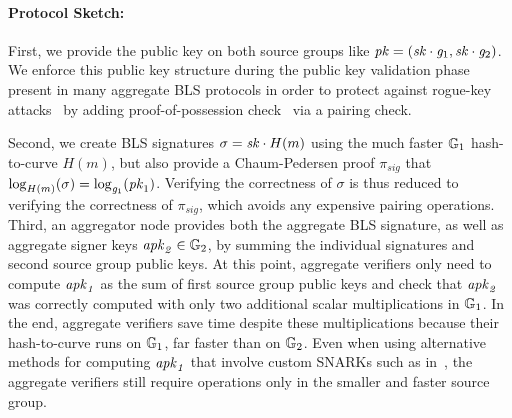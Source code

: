 \paragraph{Protocol Sketch:}
\begin{comment}
We adopt standard notation for pairing friendly curves throughout.


A classical BLS signature places the public key and signature on opposite
curves, but the choice of which creates trade offs. We mitigate these
trade offs:
\end{comment}

First, we provide the public key on both source groups%
like $\mathit{pk} = (\mathit{sk} \cdot \mathit{g}_{1}, \mathit{sk} \cdot \mathit{g}_{2})$.
We enforce this public key structure during the public key validation
phase present in many aggregate BLS protocols in order to protect against rogue-key attacks~\cite{proofs_of_posession}
by adding proof-of-possession check~\cite{proofs_of_posession} via a pairing check.

Second, we create BLS signatures $\sigma = \mathit{sk} \cdot H(m)$ using the much
faster $\mathbb{G}_{1}$ hash-to-curve $H(m)$, but also provide a Chaum-Pedersen proof
$\pi_{\mathit{sig}}$ that $\log_{H(m)}(\sigma)= \log_{\mathit{g}_{1}}(\mathit{pk}_1)$.
Verifying the correctness of $\sigma$ is thus reduced to verifying the correctness of $\pi_{\mathit{sig}}$, 
which avoids any expensive pairing operations. \\

Third, an aggregator node provides both the aggregate BLS signature,
as well as aggregate signer keys %
$\mathit{apk}_{\mathit{2}} \in \mathbb{G}_{2}$, by summing the individual signatures and second source group public keys.
At this point, aggregate verifiers only need to compute $\mathit{apk}_{\mathit{1}}$ as the sum of first source group public keys and 
check that $\mathit{apk}_{\mathit{2}}$ was correctly computed with only two additional scalar multiplications in $\mathbb{G}_{1}$.
In the end, aggregate verifiers save time despite these multiplications
because their hash-to-curve runs on $\mathbb{G}_{1}$, far faster than on $\mathbb{G}_{2}$.
Even when using alternative methods for computing $\mathit{apk}_{\mathit{1}}$ that involve custom SNARKs such as in~\cite{ourLC}, 
the aggregate verifiers still require operations only in the smaller and faster source group. 

